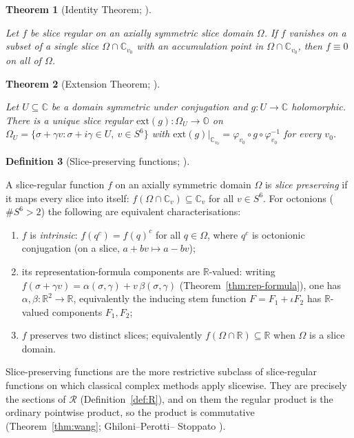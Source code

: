 \documentclass[11pt]{article}
\newcommand{\OO}{\mathbb{O}}
\newcommand{\CC}{\mathbb{C}}
\newcommand{\RR}{\mathbb{R}}
\providecommand{\lean}[1]{}
\providecommand{\uses}[1]{}
\theoremstyle{plain}
\newtheorem{theorem}{Theorem}[section]
\theoremstyle{definition}
\newtheorem{definition}[theorem]{Definition}
\theoremstyle{remark}
\begin{document}
\begin{theorem}[Identity Theorem; {\cite[Cor.~5.1.9]{CSS12}}]\label{thm:identity}
\lean{stem_identity}
\uses{def:slice-regular}
Let $f$ be slice regular on an axially symmetric slice domain $\Omega$. If $f$
vanishes on a subset of a single slice $\Omega\cap\CC_{v_0}$ with an accumulation
point in $\Omega\cap\CC_{v_0}$, then $f\equiv0$ on all of $\Omega$.
\end{theorem}

\begin{theorem}[Extension Theorem; {\cite[Thm.~5.1.5]{CSS12}}]\label{thm:extension}
\uses{def:slice-regular}
Let $U\subseteq\CC$ be a domain symmetric under conjugation and $g:U\to\CC$
holomorphic. There is a unique slice regular $\mathrm{ext}(g):\Omega_U\to\OO$ on
$\Omega_U=\{\sigma+\gamma v:\sigma+i\gamma\in U,\ v\in S^6\}$ with
$\mathrm{ext}(g)|_{\CC_{v_0}}=\varphi_{v_0}\circ g\circ\varphi_{v_0}^{-1}$ for every
$v_0$.
\end{theorem}

\begin{definition}[Slice-preserving functions; ]\label{def:slice-preserving}
\lean{IsIntrinsic, StemRing.isIntrinsic, StemRing.real_on_real}
\uses{def:slice-regular, thm:rep-formula}
A slice-regular function $f$ on an axially symmetric domain $\Omega$ is \emph{slice
preserving} if it maps every slice into itself: $f(\Omega\cap\CC_v)\subseteq\CC_v$ for all
$v\in S^6$. For octonions ($\#S^6>2$) the following are equivalent characterisations:
\begin{enumerate}[leftmargin=2.4em]
\item[(i)] $f$ is \emph{intrinsic}: $f(q^{c})=f(q)^{c}$ for all $q\in\Omega$, where $q^{c}$
  is octonionic conjugation (on a slice, $a+bv\mapsto a-bv$);
\item[(ii)] its representation-formula components are $\RR$-valued: writing
  $f(\sigma+\gamma v)=\alpha(\sigma,\gamma)+v\,\beta(\sigma,\gamma)$
  (Theorem~\ref{thm:rep-formula}), one has $\alpha,\beta:\RR^2\to\RR$, equivalently the
  inducing stem function $F=F_1+\iota F_2$ has $\RR$-valued components $F_1,F_2$;
\item[(iii)] $f$ preserves two distinct slices; equivalently $f(\Omega\cap\RR)\subseteq\RR$
  when $\Omega$ is a slice domain.
\end{enumerate}
Slice-preserving functions are the more restrictive subclass of slice-regular functions on
which classical complex methods apply slicewise. They are precisely the sections of
$\mathcal R$ (Definition~\ref{def:R}), and on them the regular product is the ordinary
pointwise product, so the product is commutative (Theorem~\ref{thm:wang}; Ghiloni--Perotti--
Stoppato \cite[Rem.~1.8]{SeriesExp}).
\end{definition}
\end{document}
